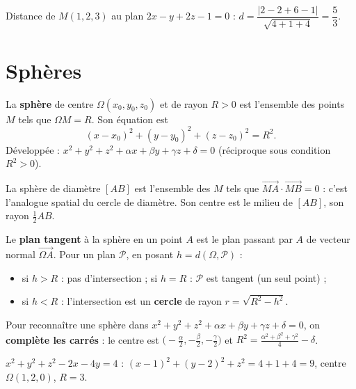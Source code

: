 \begin{exemple}
Distance de $M(1,2,3)$ au plan $2x-y+2z-1=0$ :
$d=\dfrac{|2-2+6-1|}{\sqrt{4+1+4}}=\dfrac{5}{3}$.
\end{exemple}

\section{Sphères}

\begin{definition}[Sphère]
La \textbf{sphère} de centre $\Omega(x_0,y_0,z_0)$ et de rayon $R>0$ est l'ensemble des
points $M$ tels que $\Omega M=R$. Son équation est
\[
(x-x_0)^{2}+(y-y_0)^{2}+(z-z_0)^{2}=R^{2}.
\]
Développée : $x^{2}+y^{2}+z^{2}+\alpha x+\beta y+\gamma z+\delta=0$ (réciproque sous condition $R^{2}>0$).
\end{definition}

\begin{propriete}
La sphère de diamètre $[AB]$ est l'ensemble des $M$ tels que
$\overrightarrow{MA}\cdot\overrightarrow{MB}=0$ : c'est l'analogue spatial du cercle de
diamètre. Son centre est le milieu de $[AB]$, son rayon $\tfrac12 AB$.
\end{propriete}

\begin{propriete}
Le \textbf{plan tangent} à la sphère en un point $A$ est le plan passant par $A$ de vecteur
normal $\overrightarrow{\Omega A}$. Pour un plan $\mathcal P$, en posant $h=d(\Omega,\mathcal P)$ :
\begin{itemize}
\item si $h>R$ : pas d'intersection ; \quad si $h=R$ : $\mathcal P$ est tangent (un seul point) ;
\item si $h<R$ : l'intersection est un \textbf{cercle} de rayon $r=\sqrt{R^{2}-h^{2}}$.
\end{itemize}
\end{propriete}

\begin{aretenir}
Pour reconnaître une sphère dans $x^{2}+y^{2}+z^{2}+\alpha x+\beta y+\gamma z+\delta=0$,
on \textbf{complète les carrés} : le centre est $\big(-\tfrac\alpha2,-\tfrac\beta2,-\tfrac\gamma2\big)$
et $R^{2}=\tfrac{\alpha^{2}+\beta^{2}+\gamma^{2}}4-\delta$.
\end{aretenir}

\begin{exemple}
$x^{2}+y^{2}+z^{2}-2x-4y=4$ : $(x-1)^{2}+(y-2)^{2}+z^{2}=4+1+4=9$, centre $\Omega(1,2,0)$, $R=3$.
\end{exemple}

